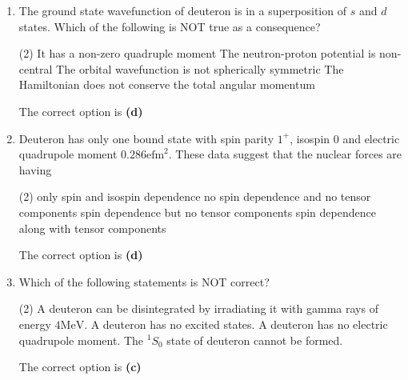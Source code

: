 \begin{enumerate}
\item The ground state wavefunction of deuteron is in a superposition of $s$ and $d$ states. Which of the following is NOT true as a consequence?
{}
\begin{tasks}(2)
	\task[\textbf{A.}] It has a non-zero quadruple moment 
	\task[\textbf{B.}]The neutron-proton potential is non-central
	\task[\textbf{C.}] The orbital wavefunction is not spherically symmetric
	\task[\textbf{D.}]The Hamiltonian does not conserve the total angular momentum
\end{tasks}
\begin{answer}
	The correct option is \textbf{(d)}
\end{answer}
\item Deuteron has only one bound state with spin parity $1^{+}$, isospin 0 and electric quadrupole moment $0.286 \mathrm{efm}^{2}$. These data suggest that the nuclear forces are having
{}
\begin{tasks}(2)
	\task[\textbf{A.}] only spin and isospin dependence
	\task[\textbf{B.}] no spin dependence and no tensor components
	\task[\textbf{C.}]spin dependence but no tensor components
	\task[\textbf{D.}]spin dependence along with tensor components
\end{tasks}
\begin{answer}
The correct option is \textbf{(d)}	
\end{answer}
\item Which of the following statements is NOT correct?
{}
\begin{tasks}(2)
	\task[\textbf{A.}] A deuteron can be disintegrated by irradiating it with gamma rays of energy $4 \mathrm{MeV}$.
	\task[\textbf{B.}] A deuteron has no excited states.
	\task[\textbf{C.}] A deuteron has no electric quadrupole moment.
	\task[\textbf{D.}] The ${ }^{1} S_{0}$ state of deuteron cannot be formed.
\end{tasks}
\begin{answer}
	The correct option is \textbf{(c)}
\end{answer}
\end{enumerate}